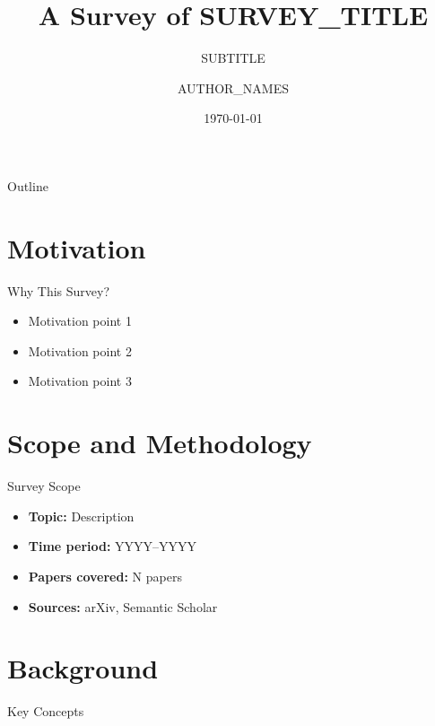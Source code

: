 \documentclass[aspectratio=169]{beamer}
\title{A Survey of SURVEY_TITLE}
\subtitle{SUBTITLE}
\author{AUTHOR_NAMES}
\date{\today}
\institute{INSTITUTION}
\begin{document}
\begin{frame}
\titlepage
\end{frame}

\begin{frame}{Outline}
\tableofcontents
\end{frame}

\section{Motivation}

\begin{frame}{Why This Survey?}
\begin{itemize}
  \item Motivation point 1
  \item Motivation point 2
  \item Motivation point 3
\end{itemize}
\end{frame}

\section{Scope and Methodology}

\begin{frame}{Survey Scope}
\begin{itemize}
  \item \textbf{Topic:} Description
  \item \textbf{Time period:} YYYY--YYYY
  \item \textbf{Papers covered:} N papers
  \item \textbf{Sources:} arXiv, Semantic Scholar
\end{itemize}
\end{frame}

\section{Background}

\begin{frame}{Key Concepts}
\end{frame}
\end{document}

